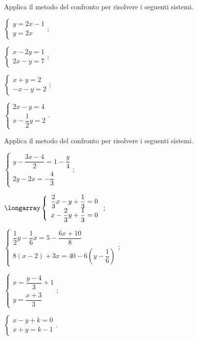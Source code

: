 \begin{esercizio}[\Ast]
 \label{ese:22.17}
Applica il metodo del confronto per risolvere i seguenti sistemi.
 \begin{multicols}{2}
 \begin{enumeratea}
 \item $\left\{\begin{array}{l}y=2x-1\\y=2x\end{array}\right.;$
\item $\left\{\begin{array}{l}x-2y=1\\2x-y=7\end{array}\right.;$
\item $\left\{\begin{array}{l}x+y=2\\-x-y=2\end{array}\right.;$
\item $\left\{\begin{array}{l}2x-y=4\\x-\dfrac{1}{2}y=2\end{array}\right..$
 \end{enumeratea}
 \end{multicols}
\end{esercizio}

\begin{esercizio}[\Ast]
 \label{ese:22.18}
Applica il metodo del confronto per risolvere i seguenti sistemi.
 \begin{multicols}{2}
 \begin{enumeratea}
\item $\left\{\begin{array}{l}y-\dfrac{3x-4}{2}=1-\dfrac{y}{4}\\2y-2x=-{\dfrac{4}{3}}\end{array}\right.;$
\item $\longarray\left\{\begin{array}{l}\dfrac{2}{3}x-y+\dfrac{1}{3}=0\\x-\dfrac{2}{3}y+\dfrac{1}{3}=0\end{array}\right.;$
\item $\left\{\begin{array}{l}\dfrac{1}{2}y-\dfrac{1}{6}x=5-\dfrac{6x+10}{8}\\8(x-2)+3x=40-6\left(y-\dfrac{1}{6}\right)\end{array}\right.;$
\item $\left\{\begin{array}{l}x=\dfrac{y-4}{3}+1\\y=\dfrac{x+3}{3}\end{array}\right.;$
\item $\left\{\begin{array}{l}x-y+k=0\\x+y=k-1\end{array}\right..$
 \end{enumeratea}
 \end{multicols}
\end{esercizio}

